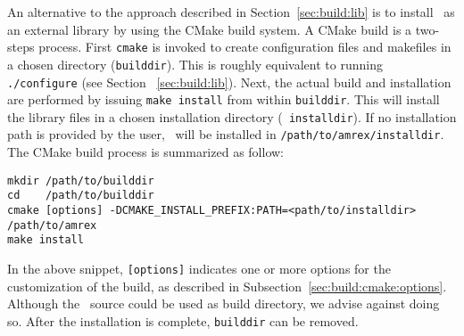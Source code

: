 An alternative to the approach described in Section~\ref{sec:build:lib}
is to install \amrex\ as an external library by using the CMake build system.
A CMake build is a two-steps process. First {\tt cmake} is invoked to create 
configuration files and makefiles in a chosen directory ({\tt builddir}). 
This is roughly equivalent to running  {\tt ./configure} (see Section
~\ref{sec:build:lib}). Next, the actual build and installation are performed
by issuing {\tt make install} from within {\tt builddir}. This will install
the library files in a chosen installation directory ({\tt
  installdir}). If no installation path is provided by the user,
\amrex\ will be installed in {\tt /path/to/amrex/installdir}.
The CMake build process is summarized as follow:
\begin{verbatim}
mkdir /path/to/builddir
cd    /path/to/builddir
cmake [options] -DCMAKE_INSTALL_PREFIX:PATH=<path/to/installdir>  /path/to/amrex 
make install
\end{verbatim} 
In the above snippet, {\tt [options]} indicates one or more options for the customization
of the build, as described in Subsection~\ref{sec:build:cmake:options}. 
Although the \amrex\ source could be used as build directory, we advise against doing so.
After the installation is complete, {\tt builddir} can be removed. 
